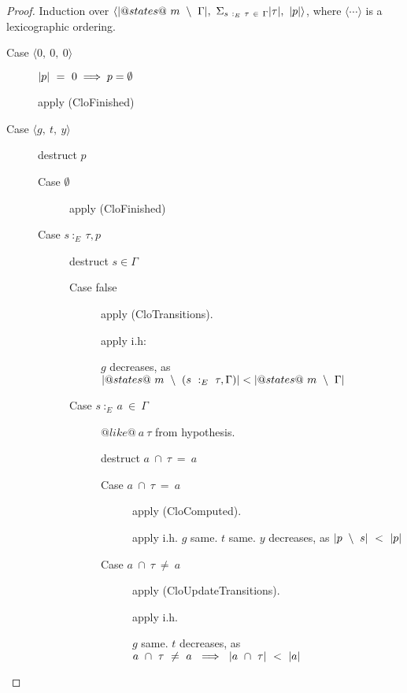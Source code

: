 \begin{proof}
Induction over $\langle |@states@~m~\setminus~\Gamma|,~\Sigma_{s~:_E~\tau~\in~\Gamma}|\tau|,~|p| \rangle$, where $\langle \cdots \rangle$ is a lexicographic ordering.

\begin{description}
\item[Case $\langle 0,~0,~0 \rangle$]

$|p|~=~0 \implies p=\emptyset$

apply (CloFinished)

\item[Case $\langle g,~t,~y \rangle$]

destruct $p$
\begin{description}
\item[Case $\emptyset$]

apply (CloFinished)

\item[Case $s~:_E~\tau, p$]

destruct $s \in \Gamma$
\begin{description}
\item[Case false]

apply (CloTransitions).

apply i.h:

$g$ decreases, as
$|@states@~m~\setminus~(s~:_E~\tau, \Gamma)| < |@states@~m~\setminus~\Gamma|$

\item[Case $s~:_E~a~\in~\Gamma$]

$@like@~a~\tau$ from hypothesis.

destruct $a~\cap~\tau~=~a$
\begin{description}
\item[Case $a~\cap~\tau~=~a$]

apply (CloComputed).

apply i.h.
$g$ same. $t$ same. $y$ decreases, as $|p~\setminus~s|~<~|p|$

\item[Case $a~\cap~\tau~\not=~a$]

apply (CloUpdateTransitions).

apply i.h.

$g$ same. $t$ decreases, as
$a~\cap~\tau~\not=~a~\implies~|a~\cap~\tau|~<~|a|$

\end{description}
\end{description}
\end{description}
\end{description}
    


\end{proof}


